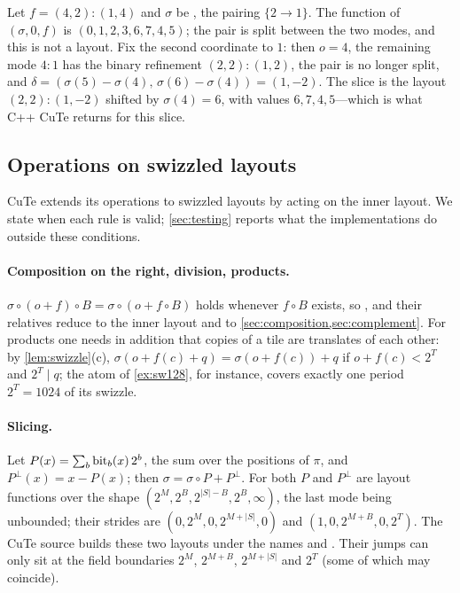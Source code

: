 \begin{example}\label{ex:decay}
Let $f=(4,2):(1,4)$ and $\sigma$ be , the pairing $\{2\to1\}$. The function
of $(\sigma,0,f)$ is $(0,1,2,3,6,7,4,5)$; the pair is split between the two modes, and this is
not a layout. Fix the second coordinate to $1$: then $o=4$, the remaining mode $4:1$ has the
binary refinement $(2,2):(1,2)$, the pair is no longer split, and
$\delta=(\sigma(5)-\sigma(4),\,\sigma(6)-\sigma(4))=(1,-2)$. The slice is the layout
$(2,2):(1,-2)$ shifted by $\sigma(4)=6$, with values $6,7,4,5$---which is what C++ CuTe returns for
this slice.
\end{example}

\subsection{Operations on swizzled layouts}\label{sec:swzops}

CuTe extends its operations to swizzled layouts by acting on the inner layout. We state when each
rule is valid; \cref{sec:testing} reports what the implementations do outside these conditions.

\paragraph{Composition on the right, division, products.}
$\sigma\circ(o+f)\circ B=\sigma\circ(o+f\circ B)$ holds whenever $f\circ B$ exists, so
,  and their relatives reduce to the inner layout and to
\cref{sec:composition,sec:complement}. For products one needs in addition that copies of a tile
are translates of each other: by \cref{lem:swizzle}(c),
$\sigma(o+f(c)+q)=\sigma(o+f(c))+q$ if $o+f(c)<2^T$ and $2^T\mid q$; the atom of
\cref{ex:sw128}, for instance, covers exactly one period $2^T=1024$ of its swizzle.

\paragraph{Slicing.}
Let $P(x)=\sum_b\operatorname{bit}_b(x)\,2^b$, the sum over the positions of $\pi$, and $P^\perp(x)=x-P(x)$; then
$\sigma=\sigma\circ P+P^\perp$. For  both $P$ and $P^\perp$ are layout
functions over the shape $(2^M,2^B,2^{|S|-B},2^B,\infty)$, the last mode being unbounded; their
strides are $(0,2^M,0,2^{M+|S|},0)$ and $(1,0,2^{M+B},0,2^T)$. The CuTe source builds these two
layouts under the names  and . Their jumps can
only sit at the field boundaries $2^M$, $2^{M+B}$, $2^{M+|S|}$ and $2^T$ (some of which may
coincide).

